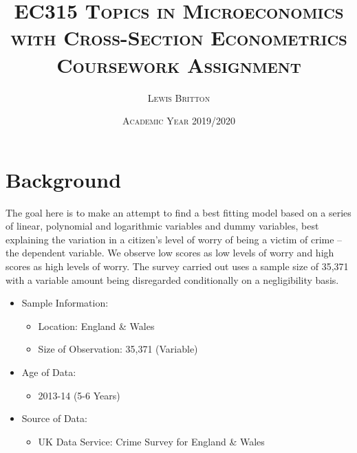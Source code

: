 \documentclass[11pt, english]{article}
\begin{document}
                               
                                              
                       
        \title{\textsc{EC315 Topics in Microeconomics with Cross-Section Econometrics\\ Coursework Assignment}}
        \author{\textsc{Lewis Britton}}
        \date{\textsc{Academic Year 2019/2020}}
        \maketitle

\newpage
                         

	\renewcommand{\contentsname}{Table of Contents}

        \tableofcontents

\newpage


\section{Background}

	The goal here is to make an attempt to find a best fitting model based on a series of linear, polynomial and logarithmic variables and dummy variables, best explaining the variation in a citizen's level of worry of being a victim of crime – the dependent variable. We observe low scores as low levels of worry and high scores as high levels of worry. The survey carried out uses a sample size of 35,371 with a variable amount being disregarded conditionally on a negligibility basis.\\

	\begin{itemize}
	\setlength\itemsep{0cm}
		\item Sample Information:
		\begin{itemize}
			\item Location: England \& Wales
			\item Size of Observation: 35,371 (Variable)
		\end{itemize}
		\item Age of Data:
		\begin{itemize}
			\item 2013-14 (5-6 Years)
		\end{itemize}
		\item Source of Data:
		\begin{itemize}
			\item UK Data Service: Crime Survey for England \& Wales
		\end{itemize}
	\end{itemize}
\end{document}
